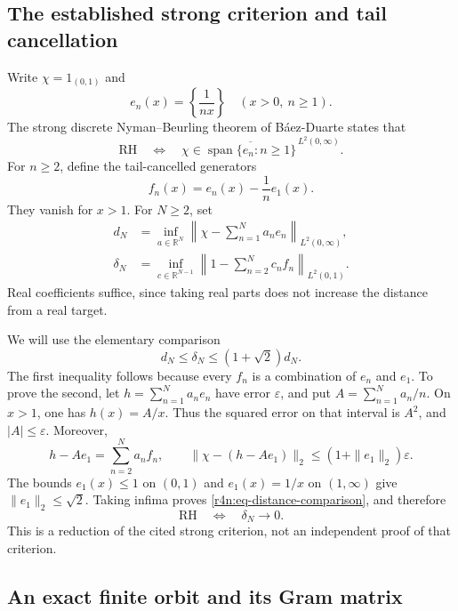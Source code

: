 \documentclass[11pt,a4paper]{article}
\theoremstyle{definition}\newtheorem{definition}[theorem]{Definition}
\theoremstyle{remark}\newtheorem{remark}[theorem]{Remark}
\newcommand{\R}{\mathbb R}\newcommand{\Z}{\mathbb Z}
\numberwithin{equation}{section}
\begin{document}
\subsection{The established strong criterion and tail cancellation}
\label{r4n:subsec-criterion}

Write $\chi=1_{(0,1)}$ and
\[
 e_n(x)=\left\{\frac1{nx}\right\}\quad(x>0,\ n\ge1).
\]
The strong discrete Nyman--Beurling theorem of B\'aez-Duarte
\cite{BaezDuarte} states that
\begin{equation}
\label{r4n:eq-strong-bd}
 \mathrm{RH}
 \quad\Longleftrightarrow\quad
 \chi\in\overline{\operatorname{span}\{e_n:n\ge1\}}^{\,L^2(0,\infty)}.
\end{equation}
For $n\ge2$, define the tail-cancelled generators
\begin{equation}
\label{r4n:eq-generators}
 f_n(x)=e_n(x)-\frac1n e_1(x).
\end{equation}
They vanish for $x>1$.
For $N\ge2$, set
\[
 \begin{aligned}
 d_N&=\inf_{a\in\R^N}
       \left\|\chi-\sum_{n=1}^Na_ne_n\right\|_{L^2(0,\infty)},\\
 \delta_N&=\inf_{c\in\R^{N-1}}
       \left\|1-\sum_{n=2}^Nc_nf_n\right\|_{L^2(0,1)}.
 \end{aligned}
\]
Real coefficients suffice, since taking real parts does not increase
the distance from a real target.

We will use the elementary comparison
\begin{equation}
\label{r4n:eq-distance-comparison}
 d_N\le\delta_N\le(1+\sqrt2)d_N.
\end{equation}
The first inequality follows because every $f_n$ is a combination of
$e_n$ and $e_1$.  To prove the second, let
$h=\sum_{n=1}^Na_ne_n$ have error $\varepsilon$, and put
$A=\sum_{n=1}^Na_n/n$.  On $x>1$, one has $h(x)=A/x$.
Thus the squared error on that interval is $A^2$, and $|A|\le\varepsilon$.
Moreover,
\[
 h-Ae_1=\sum_{n=2}^Na_nf_n,\qquad
 \|\chi-(h-Ae_1)\|_2\le(1+\|e_1\|_2)\varepsilon.
\]
The bounds $e_1(x)\le1$ on $(0,1)$ and $e_1(x)=1/x$ on $(1,\infty)$
give $\|e_1\|_2\le\sqrt2$.
Taking infima proves \eqref{r4n:eq-distance-comparison}, and therefore
\begin{equation}
\label{r4n:eq-anchored-criterion}
 \mathrm{RH}\quad\Longleftrightarrow\quad\delta_N\longrightarrow0.
\end{equation}
This is a reduction of the cited strong criterion, not an independent
proof of that criterion.

\subsection{An exact finite orbit and its Gram matrix}
\label{r4n:subsec-finite}
\end{document}

